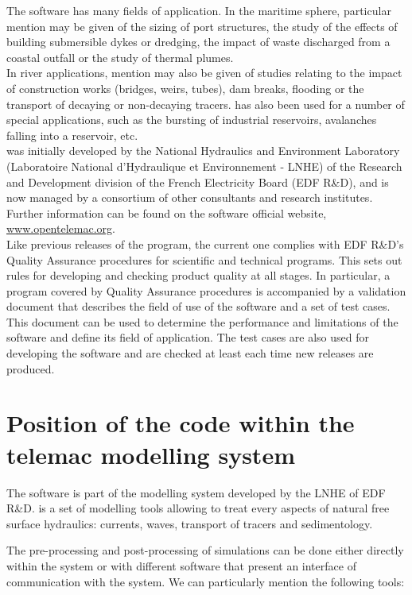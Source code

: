 The software has many fields of application.
In the maritime sphere, particular mention may be given of the sizing of port
structures, the study of the effects of building submersible dykes or dredging,
the impact of waste discharged from a coastal outfall or the study of thermal
plumes.\\
In river applications, mention may also be given of studies relating to the impact
of construction works (bridges, weirs, tubes), dam breaks,
flooding or the transport of decaying or non-decaying tracers.
 has also been used for a number of special applications,
such as the bursting of industrial reservoirs, avalanches falling
into a reservoir, etc.\\

 was initially developed by the National Hydraulics and Environment
Laboratory (Laboratoire National d'Hydraulique et Environnement - LNHE)
of the Research and Development division of the French Electricity Board
(EDF R\&D), and is now managed by a consortium of other consultants and
research institutes. Further information can be found on the software official
website, \url{www.opentelemac.org}.\\

Like previous releases of the program, the current one complies with EDF R\&D's
Quality Assurance procedures for scientific and technical programs.
This sets out rules for developing and checking product quality at all stages.
In particular, a program covered by Quality Assurance procedures is accompanied
by a validation document that describes the field of use of the software
and a set of test cases.
This document can be used to determine the performance and limitations of the
software and define its field of application.
The test cases are also used for developing the software
and are checked at least each time new releases are produced.


\section{Position of the  code within the telemac modelling system}

The  software is part of the \tel modelling system developed by
the LNHE of EDF R\&D. \tel is a set of modelling tools allowing to treat
every aspects of natural free surface hydraulics: currents, waves, transport of
tracers and sedimentology.

The pre-processing and post-processing of simulations can be done either
directly within the \tel system or with different software that present an
interface of communication with the system. We can particularly mention the
following tools:


